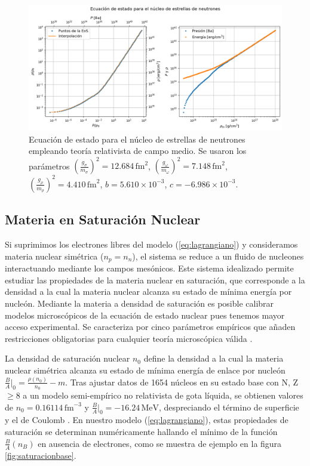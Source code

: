 \begin{figure}[h]
	\centering
	\includegraphics[width=0.95\linewidth]{Figuras/materia_estelar_base}
	\caption[Ecuación de estado para el núcleo de estrellas de neutrones.]{Ecuación de estado para el núcleo de estrellas de neutrones empleando teoría relativista de campo medio. Se usaron los parámetros $\left(\frac{g_\sigma}{m_\sigma}\right)^2=12.684\,\text{fm}^2$, $\left(\frac{g_\omega}{m_\omega}\right)^2=7.148\,\text{fm}^2$, $\left(\frac{g_\rho}{m_\rho}\right)^2=4.410\,\text{fm}^2$, $b=5.610\times10^{-3}$, $c=-6.986\times10^{-3}$.}
	\label{fig:materiaestelarbase}
\end{figure}


\subsection{Materia en Saturación Nuclear}
\label{sec:saturacion}

Si suprimimos los electrones libres del modelo (\ref{eq:lagrangiano}) y consideramos materia nuclear simétrica ($n_p = n_n$), el sistema se reduce a un fluido de nucleones interactuando mediante los campos mesónicos. Este sistema idealizado permite estudiar las propiedades de la materia nuclear en saturación, que corresponde a la densidad a la cual la materia nuclear alcanza su estado de mínima energía por nucleón. Mediante la materia a densidad de saturación es posible calibrar modelos microscópicos de la ecuación de estado nuclear pues tenemos mayor acceso experimental. Se caracteriza por cinco parámetros empíricos que añaden restricciones obligatorias para cualquier teoría microscópica válida \cite{kumarTheoreticalExperimentalConstraints2024}.

La densidad de saturación nuclear $n_0$ define la densidad a la cual la materia nuclear simétrica alcanza su estado de mínima energía de enlace por nucleón $\frac{B}{A}\big|_0  = \frac{\rho(n_0)}{n_0} - m$. Tras ajustar datos de 1654 núcleos en su estado base con N, Z $\geq 8$ a un modelo semi-empírico no relativista de gota líquida, se obtienen valores de $n_0 = 0.16114\, \text{fm}^{-3}$ y $\tfrac{B}{A}\big|_0 = -16.24\, \text{MeV}$, despreciando el término de superficie y el de Coulomb \cite{kumarTheoreticalExperimentalConstraints2024, myersNuclearPropertiesAccording1996}. En nuestro modelo (\ref{eq:lagrangiano}), estas propiedades de saturación se determinan numéricamente hallando el mínimo de la función $\tfrac{B}{A}(n_B)$ en ausencia de electrones, como se muestra de ejemplo en la figura \ref{fig:saturacionbase}.

